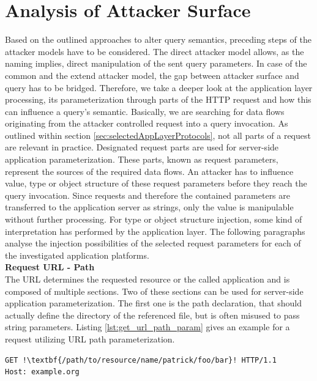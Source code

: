 \section{Analysis of Attacker Surface}
Based on the outlined approaches to alter query semantics, preceding steps of the attacker models have to be considered. The direct attacker model allows, as the naming implies, direct manipulation of the sent query parameters. In case of the common and the extend attacker model, the gap between attacker surface and query has to be bridged. Therefore, we take a deeper look at the application layer processing, its parameterization through parts of the HTTP request and how this can influence a query's semantic. Basically, we are searching for data flows originating from the attacker controlled request into a query invocation. As outlined within section \ref{sec:selectedAppLayerProtocols}, not all parts of a request are relevant in practice. Designated request parts are used for server-side application parameterization. These parts, known as request parameters, represent the sources of the required data flows. An attacker has to influence value, type or object structure of these request parameters before they reach the query invocation. Since requests and therefore the contained parameters are transferred to the application server as strings, only the value is manipulable without further processing. For type or object structure injection, some kind of interpretation has performed by the application layer. The following paragraphs analyse the injection possibilities of the selected request parameters for each of the investigated application platforms. \\

\textbf{Request URL - Path}\\
The URL determines the requested resource or the called application and is composed of multiple sections. Two of these sections can be used for server-side application parameterization. The first one is the path declaration, that should actually define the directory of the referenced file, but is often misused to pass string parameters. Listing \ref{lst:get_url_path_param} gives an example for a request utilizing URL path parameterization. \\

\begin{lstlisting}[escapechar=!, caption={Example for GET request with URL path parameterization}, label={lst:get_url_path_param}]
GET !\textbf{/path/to/resource/name/patrick/foo/bar}! HTTP/1.1
Host: example.org
\end{lstlisting}

